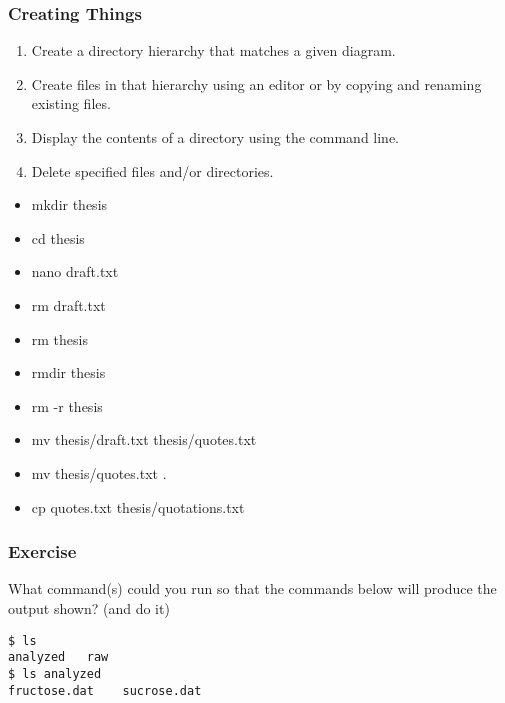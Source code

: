 \documentclass[xcolor=dvipsnames]{beamer}
\begin{document}
\begin{frame}
\frametitle{Creating Things}
\begin{enumerate}
\item    Create a directory hierarchy that matches a given diagram.
\item    Create files in that hierarchy using an editor or by copying and renaming existing files.
\item    Display the contents of a directory using the command line.
\item    Delete specified files and/or directories.
\end{enumerate}
\begin{multicols}{2}
\begin{itemize}
\item mkdir thesis
\item cd thesis
\item nano draft.txt
\item rm draft.txt
\item rm thesis
\item rmdir thesis
\item rm -r thesis
\item mv thesis/draft.txt thesis/quotes.txt
\item mv thesis/quotes.txt .
\item cp quotes.txt thesis/quotations.txt
\end{itemize}
\end{multicols}
\end{frame}

\begin{frame}[fragile]
\frametitle{Exercise}
What command(s) could you run so that the commands below will produce the output shown? (and do it)
\begin{verbatim}
$ ls
analyzed   raw
$ ls analyzed
fructose.dat    sucrose.dat
\end{verbatim}
\end{frame}
\end{document}
